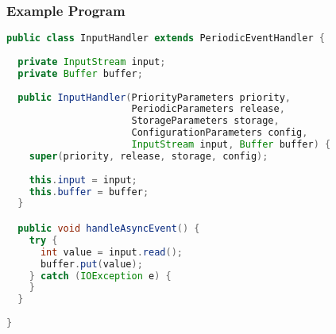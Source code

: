\documentclass{beamer}
\begin{document}
\begin{frame}
  \frametitle{Example Program}
\begin{lstlisting}[language=Java]
public class InputHandler extends PeriodicEventHandler {
    
  private InputStream input;
  private Buffer buffer;
  
  public InputHandler(PriorityParameters priority,
                      PeriodicParameters release,
                      StorageParameters storage,
                      ConfigurationParameters config,
                      InputStream input, Buffer buffer) {
    super(priority, release, storage, config);
	
    this.input = input;
    this.buffer = buffer;
  }

  public void handleAsyncEvent() {
    try {
      int value = input.read();
      buffer.put(value);
    } catch (IOException e) {
    }
  }
  
}
\end{lstlisting}
\end{frame}
\end{document}
